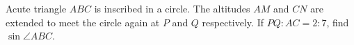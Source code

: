Acute triangle $ABC$ is inscribed in a circle. The altitudes $AM$ and $CN$ are extended to meet the circle again at $P$ and $Q$ respectively. If $PQ:AC=2:7$, find $\sin\angle ABC$.
